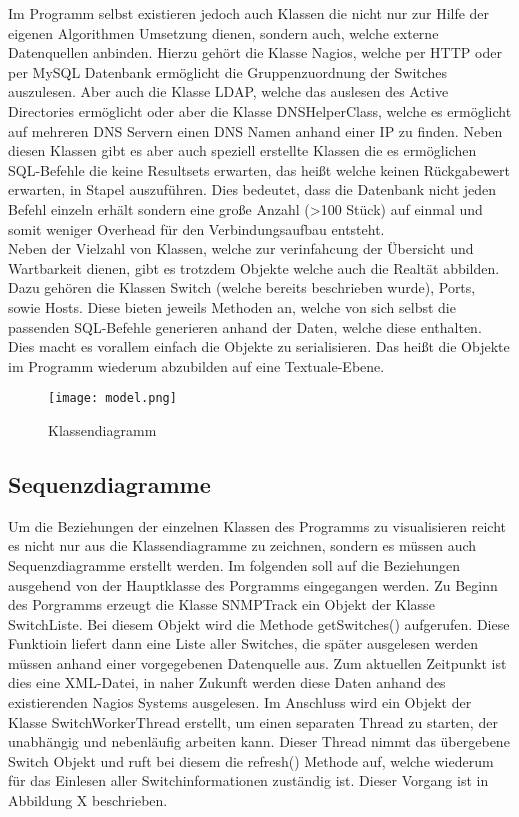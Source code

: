 Im Programm selbst existieren jedoch auch Klassen die nicht nur zur Hilfe der eigenen Algorithmen Umsetzung dienen, sondern auch, welche externe Datenquellen anbinden.
Hierzu gehört die Klasse Nagios, welche per HTTP oder per MySQL Datenbank ermöglicht die Gruppenzuordnung der Switches auszulesen. Aber auch die Klasse LDAP, welche das auslesen des Active Directories ermöglicht oder aber die Klasse DNSHelperClass, welche es ermöglicht auf mehreren DNS Servern einen DNS Namen anhand einer IP zu finden. Neben diesen Klassen gibt es aber auch speziell erstellte Klassen die es ermöglichen SQL-Befehle die keine Resultsets erwarten, das heißt welche keinen Rückgabewert erwarten, in Stapel auszuführen.
Dies bedeutet, dass die Datenbank nicht jeden Befehl einzeln erhält sondern eine große Anzahl (>100 Stück) auf einmal und somit weniger Overhead für den Verbindungsaufbau entsteht.\\
Neben der Vielzahl von Klassen, welche zur verinfahcung der Übersicht und Wartbarkeit dienen, gibt es trotzdem Objekte welche auch die Realtät abbilden. Dazu gehören die Klassen Switch (welche bereits beschrieben wurde), Ports, sowie Hosts. Diese bieten jeweils Methoden an, welche von sich selbst die passenden SQL-Befehle generieren anhand der Daten, welche diese enthalten. Dies macht es vorallem einfach die Objekte zu serialisieren. Das heißt die Objekte im Programm wiederum abzubilden auf eine Textuale-Ebene.\\

\begin{figure}[H]
\centering
\texttt{[image: model.png]}
\caption{Klassendiagramm}
\label{fig:classdiagram}
\end{figure}

\subsection{Sequenzdiagramme}
\label{subsec:seqdiagrams}

Um die Beziehungen der einzelnen Klassen des Programms zu visualisieren reicht es nicht nur aus die Klassendiagramme zu zeichnen, sondern es müssen auch Sequenzdiagramme erstellt werden. Im folgenden soll auf die Beziehungen ausgehend von der Hauptklasse des Porgramms eingegangen werden.
Zu Beginn des Porgramms erzeugt die Klasse SNMPTrack ein Objekt der Klasse SwitchListe.
Bei diesem Objekt wird die Methode getSwitches() aufgerufen. Diese Funktioin liefert dann eine Liste aller Switches, die später ausgelesen werden müssen anhand einer vorgegebenen Datenquelle aus. Zum aktuellen Zeitpunkt ist dies eine XML-Datei, in naher Zukunft werden diese Daten anhand des existierenden Nagios Systems ausgelesen. Im Anschluss wird ein Objekt der Klasse SwitchWorkerThread erstellt, um einen separaten Thread zu starten, der unabhängig und nebenläufig arbeiten kann. Dieser Thread nimmt das übergebene Switch Objekt und ruft bei diesem die refresh() Methode auf, welche wiederum für das Einlesen aller Switchinformationen zuständig ist. Dieser Vorgang ist in Abbildung X beschrieben.


